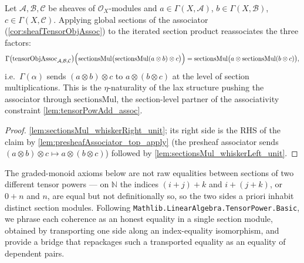 \begin{lemma}

  \label{lem:tensorObjAssoc_hom_sectionsMul}
  Let \(\mathcal{A}, \mathcal{B}, \mathcal{C}\) be sheaves of
  \(\mathcal{O}_X\)-modules and \(a \in \Gamma(X,\mathcal{A})\),
  \(b \in \Gamma(X,\mathcal{B})\), \(c \in \Gamma(X,\mathcal{C})\). Applying global
  sections of the associator (\cref{cor:sheafTensorObjAssoc}) to the iterated
  section product reassociates the three factors:
  \[
    \Gamma\bigl(\mathrm{tensorObjAssoc}_{\mathcal{A},\mathcal{B},\mathcal{C}}\bigr)
      \Bigl(\mathrm{sectionsMul}\bigl(
        \mathrm{sectionsMul}(a \otimes b) \otimes c\bigr)\Bigr)
      = \mathrm{sectionsMul}\bigl(a \otimes \mathrm{sectionsMul}(b \otimes c)\bigr),
  \]
  i.e.\ \(\Gamma(\alpha)\) sends \((a \otimes b) \otimes c\) to
  \(a \otimes (b \otimes c)\) at the level of section multiplications. This is the
  \(\eta\)-naturality of the lax structure pushing the associator through
  \(\mathrm{sectionsMul}\), the section-level partner of the associativity
  constraint \cref{lem:tensorPowAdd_assoc}.
\end{lemma}

\begin{proof}
  \leanok
  \cref{lem:sectionsMul_whiskerRight_unit}; its right side is the RHS of the claim
  by \cref{lem:presheafAssociator_top_apply} (the presheaf associator sends
  \((a \otimes b) \otimes c \mapsto a \otimes (b \otimes c)\)) followed by
  \cref{lem:sectionsMul_whiskerLeft_unit}.
\end{proof}

The graded-monoid axioms below are not raw equalities between sections of two
different tensor powers --- on \(\mathbb{N}\) the indices \((i+j)+k\) and
\(i+(j+k)\), or \(0+n\) and \(n\), are equal but not definitionally so, so the two
sides a priori inhabit distinct section modules. Following
\texttt{Mathlib.LinearAlgebra.TensorPower.Basic}, we phrase each coherence as an
honest equality in a single section module, obtained by transporting one side
along an index-equality isomorphism, and provide a bridge that repackages such a
transported equality as an equality of dependent pairs.

